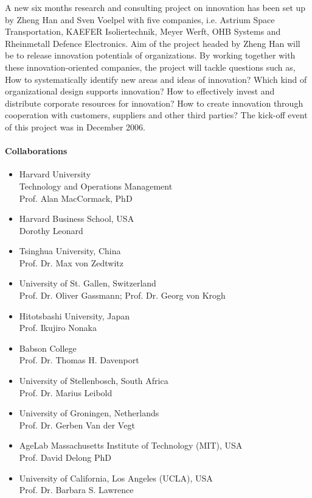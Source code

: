  A new six months research and consulting project on innovation has been set up by Zheng Han and Sven Voelpel with five companies, i.e. Astrium Space Transportation, KAEFER Isoliertechnik, Meyer Werft, OHB Systems and Rheinmetall Defence Electronics. Aim of the project headed by Zheng Han will be to release innovation potentials of organizations. By working together with these innovation-oriented companies, the project will tackle questions such as, How to systematically identify new areas and ideas of innovation? Which kind of organizational design supports innovation? How to effectively invest and distribute corporate resources for innovation? How to create innovation through cooperation with customers, suppliers and other third parties? The kick-off event of this project was in December 2006. 

\newpage
\paragraph{Collaborations}
\begin{itemize}
\item  Harvard University \\ Technology and Operations Management \\ Prof. Alan MacCormack, PhD
\item  Harvard Business School, USA \\ Dorothy Leonard
\item  Tsinghua University, China \\ Prof. Dr. Max von Zedtwitz
\item  University of St. Gallen, Switzerland \\ Prof. Dr. Oliver Gassmann; Prof. Dr. Georg von Krogh
\item  Hitotsbashi University, Japan \\ Prof. Ikujiro Nonaka
\item  Babson College \\ Prof. Dr. Thomas H. Davenport
\item  University of Stellenbosch, South Africa \\ Prof. Dr. Marius Leibold
\item  University of Groningen, Netherlands \\ Prof. Dr. Gerben Van der Vegt
\item  AgeLab Massachusetts Institute of Technology (MIT), USA \\ Prof. David Delong PhD
\item  University of California, Los Angeles (UCLA), USA \\ Prof. Dr. Barbara S. Lawrence
\end{itemize}

